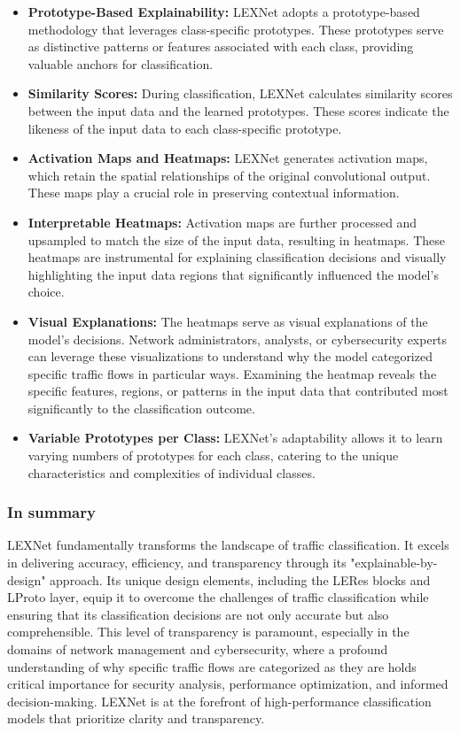 \documentclass{article}
\begin{document}
\begin{itemize}
    \item \textbf{Prototype-Based Explainability:} LEXNet adopts a prototype-based methodology that leverages class-specific prototypes. These prototypes serve as distinctive patterns or features associated with each class, providing valuable anchors for classification.
    \item \textbf{Similarity Scores:} During classification, LEXNet calculates similarity scores between the input data and the learned prototypes. These scores indicate the likeness of the input data to each class-specific prototype.
    \item \textbf{Activation Maps and Heatmaps:} LEXNet generates activation maps, which retain the spatial relationships of the original convolutional output. These maps play a crucial role in preserving contextual information.
    \item \textbf{Interpretable Heatmaps:} Activation maps are further processed and upsampled to match the size of the input data, resulting in heatmaps. These heatmaps are instrumental for explaining classification decisions and visually highlighting the input data regions that significantly influenced the model's choice.
    \item \textbf{Visual Explanations:} The heatmaps serve as visual explanations of the model's decisions. Network administrators, analysts, or cybersecurity experts can leverage these visualizations to understand why the model categorized specific traffic flows in particular ways. Examining the heatmap reveals the specific features, regions, or patterns in the input data that contributed most significantly to the classification outcome.
    \item \textbf{Variable Prototypes per Class:} LEXNet's adaptability allows it to learn varying numbers of prototypes for each class, catering to the unique characteristics and complexities of individual classes.
\end{itemize}

\subsubsection{In summary} 
LEXNet fundamentally transforms the landscape of traffic classification. It excels in delivering accuracy, efficiency, and transparency through its "explainable-by-design" approach. Its unique design elements, including the LERes blocks and LProto layer, equip it to overcome the challenges of traffic classification while ensuring that its classification decisions are not only accurate but also comprehensible. This level of transparency is paramount, especially in the domains of network management and cybersecurity, where a profound understanding of why specific traffic flows are categorized as they are holds critical importance for security analysis, performance optimization, and informed decision-making. LEXNet is at the forefront of high-performance classification models that prioritize clarity and transparency.
\end{document}

